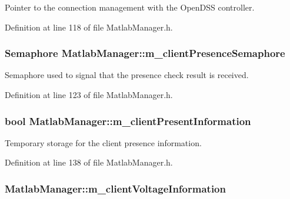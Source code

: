 Pointer to the connection management with the Open\-D\-S\-S controller. 



Definition at line 118 of file Matlab\-Manager.\-h.

\hypertarget{class_matlab_manager_a97e67367dd6bf4b6976bcd2237277d46}{
\subsubsection[{m\-\_\-client\-Presence\-Semaphore}]{\setlength{\rightskip}{0pt plus 5cm}Semaphore Matlab\-Manager\-::m\-\_\-client\-Presence\-Semaphore\hspace{0.3cm}{\ttfamily [private]}}}\label{class_matlab_manager_a97e67367dd6bf4b6976bcd2237277d46}


Semaphore used to signal that the presence check result is received. 



Definition at line 123 of file Matlab\-Manager.\-h.

\hypertarget{class_matlab_manager_acf28415517fd10ff8105e5ac80280a63}{
\subsubsection[{m\-\_\-client\-Present\-Information}]{\setlength{\rightskip}{0pt plus 5cm}bool Matlab\-Manager\-::m\-\_\-client\-Present\-Information\hspace{0.3cm}{\ttfamily [private]}}}\label{class_matlab_manager_acf28415517fd10ff8105e5ac80280a63}


Temporary storage for the client presence information. 



Definition at line 138 of file Matlab\-Manager.\-h.

\hypertarget{class_matlab_manager_abf48a413742f5d98d4a13c68b60d9e83}{
\subsubsection[{m\-\_\-client\-Voltage\-Information}]{ Matlab\-Manager\-::m\-\_\-client\-Voltage\-Information\hspace{0.3cm}{\ttfamily [private]}}}\label{class_matlab_manager_abf48a413742f5d98d4a13c68b60d9e83}


